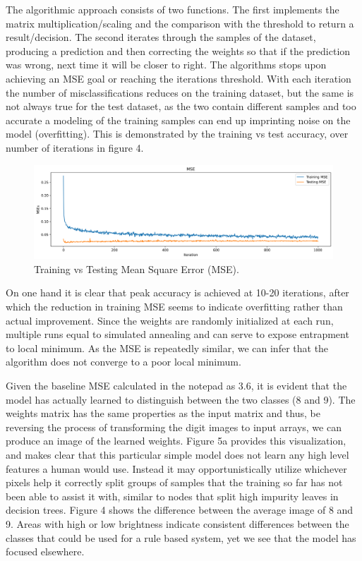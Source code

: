\documentclass{article}
\begin{document}
The algorithmic approach consists of two functions.
The first implements the matrix multiplication/scaling and the comparison with the threshold to return a result/decision.
The second iterates through the samples of the dataset, producing a prediction and then correcting the weights so that if the prediction was wrong, next time it will be closer to right.
The algorithms stops upon achieving an MSE goal or reaching the iterations threshold.
With each iteration the number of misclassifications reduces on the training dataset, but the same is not always true for the test dataset, as the two contain different samples and too accurate a modeling of the training samples can end up imprinting noise on the model (overfitting).
This is demonstrated by the training vs test accuracy, over number of iterations in figure 4.

\begin{figure}[h!]
    \centering
    \includegraphics[width=\textwidth]{./plots/plot5.png}  %
    \caption{Training vs Testing Mean Square Error (MSE).}
    \label{fig:plot6}  %
\end{figure}

On one hand it is clear that peak accuracy is achieved at 10-20 iterations, after which the reduction in training MSE seems to indicate overfitting rather than actual improvement.
Since the weights are randomly initialized at each run, multiple runs equal to simulated annealing and can serve to expose entrapment to local minimum.
As the MSE is repeatedly similar, we can infer that the algorithm does not converge to a poor local minimum.

Given the baseline MSE calculated in the notepad as 3.6, it is evident that the model has actually learned to distinguish between the two classes (8 and 9).
The weights matrix has the same properties as the input matrix and thus, be reversing the process of transforming the digit images to input arrays, we can produce an image of the learned weights.
Figure 5a provides this visualization, and makes clear that this particular simple model does not learn any high level features a human would use.
Instead it may opportunistically utilize whichever pixels help it correctly split groups of samples that the training so far has not been able to assist it with, similar to nodes that split high impurity leaves in decision trees.
Figure 4 shows the difference between the average image of 8 and 9.
Areas with high or low brightness indicate consistent differences between the classes that could be used for a rule based system, yet we see that the model has focused elsewhere.
\end{document}
